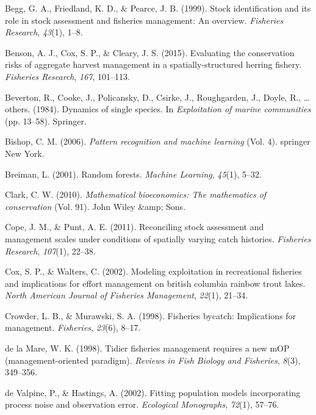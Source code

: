\documentclass[12pt,]{scrartcl}
\begin{document}
\hypertarget{ref-begg1999stock}{}
Begg, G. A., Friedland, K. D., \& Pearce, J. B. (1999). Stock
identification and its role in stock assessment and fisheries
management: An overview. \emph{Fisheries Research}, \emph{43}(1), 1--8.

\hypertarget{ref-benson2015evaluating}{}
Benson, A. J., Cox, S. P., \& Cleary, J. S. (2015). Evaluating the
conservation risks of aggregate harvest management in a
spatially-structured herring fishery. \emph{Fisheries Research},
\emph{167}, 101--113.

\hypertarget{ref-beverton1984dynamics}{}
Beverton, R., Cooke, J., Policansky, D., Csirke, J., Roughgarden, J.,
Doyle, R., \ldots{} others. (1984). Dynamics of single species. In
\emph{Exploitation of marine communities} (pp. 13--58). Springer.

\hypertarget{ref-bishop2006pattern}{}
Bishop, C. M. (2006). \emph{Pattern recognition and machine learning}
(Vol. 4). springer New York.

\hypertarget{ref-breiman2001random}{}
Breiman, L. (2001). Random forests. \emph{Machine Learning},
\emph{45}(1), 5--32.

\hypertarget{ref-clark2010mathematical}{}
Clark, C. W. (2010). \emph{Mathematical bioeconomics: The mathematics of
conservation} (Vol. 91). John Wiley \&amp; Sons.

\hypertarget{ref-cope2011reconciling}{}
Cope, J. M., \& Punt, A. E. (2011). Reconciling stock assessment and
management scales under conditions of spatially varying catch histories.
\emph{Fisheries Research}, \emph{107}(1), 22--38.

\hypertarget{ref-cox2002modeling}{}
Cox, S. P., \& Walters, C. (2002). Modeling exploitation in recreational
fisheries and implications for effort management on british columbia
rainbow trout lakes. \emph{North American Journal of Fisheries
Management}, \emph{22}(1), 21--34.

\hypertarget{ref-crowder1998fisheries}{}
Crowder, L. B., \& Murawski, S. A. (1998). Fisheries bycatch:
Implications for management. \emph{Fisheries}, \emph{23}(6), 8--17.

\hypertarget{ref-de-la-Mare1998Tidier-fisherie}{}
de la Mare, W. K. (1998). Tidier fisheries management requires a new mOP
(management-oriented paradigm). \emph{Reviews in Fish Biology and
Fisheries}, \emph{8}(3), 349--356.

\hypertarget{ref-de2002fitting}{}
de Valpine, P., \& Hastings, A. (2002). Fitting population models
incorporating process noise and observation error. \emph{Ecological
Monographs}, \emph{72}(1), 57--76.
\end{document}
